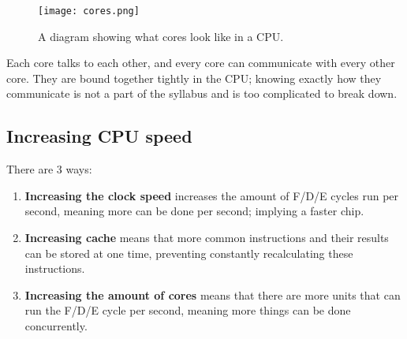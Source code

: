 \documentclass[../main.tex]{subfiles}
\begin{document}
\begin{figure}[H]
    \centering
    \texttt{[image: cores.png]}
    \caption{A diagram showing what cores look like in a CPU.}
    \label{fig:cores}
\end{figure}

Each core talks to each other, and every core can communicate with every other core. They are bound together tightly in the CPU; knowing exactly how they communicate is not a part of the syllabus and is too complicated to break down.

\subsection{Increasing CPU speed}

There are 3 ways:

\begin{enumerate}
    \item \textbf{Increasing the clock speed} increases the amount of F/D/E cycles run per second, meaning more can be done per second; implying a faster chip.
    \item \textbf{Increasing cache} means that more common instructions and their results can be stored at one time, preventing constantly recalculating these instructions.
    \item \textbf{Increasing the amount of cores} means that there are more units that can run the F/D/E cycle per second, meaning more things can be done concurrently.
\end{enumerate}
\end{document}
